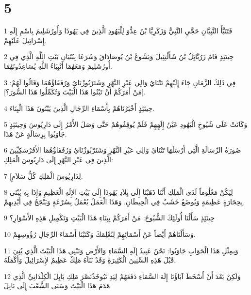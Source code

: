 \chapter{5}

\par 1 فَتَنَبَّأَ النَّبِيَّانِ حَجَّيِ النَّبِيُّ وَزَكَرِيَّا بْنُ عِدُّوَ لِلْيَهُودِ الَّذِينَ فِي يَهُوذَا وَأُورُشَلِيمَ بِاسْمِ إِلَهِ إِسْرَائِيلَ عَلَيْهِمْ.
\par 2 حِينَئِذٍ قَامَ زَرُبَّابَِلُ بْنُ شَأَلْتِئِيلَ وَيَشُوعُ بْنُ يُوصَادَاقَ وَشَرَعَا بِبُنْيَانِ بَيْتِ اللَّهِ الَّذِي فِي أُورُشَلِيمَ وَمَعَهُمَا أَنْبِيَاءُ اللَّهِ يُسَاعِدُونَهُمَا.
\par 3 فِي ذَلِكَ الزَّمَانِ جَاءَ إِلَيْهِمْ تَتْنَايُ وَالِي عَبْرِ النَّهْرِ وَشَتَرْبُوزْنَايُ وَرُفَقَاؤُهُمَا وَقَالُوا لَهُمْ: [مَنْ أَمَرَكُمْ أَنْ تَبْنُوا هَذَا الْبَيْتَ وَتُكَمِّلُوا هَذَا السُّورَ؟].
\par 4 حِينَئِذٍ أَخْبَرْنَاهُمْ بِأَسْمَاءِ الرِّجَالِ الَّذِينَ يَبْنُونَ هَذَا الْبِنَاءَ.
\par 5 وَكَانَتْ عَلَى شُيُوخِ الْيَهُودِ عَيْنُ إِلَهِهِمْ فَلَمْ يُوقِفُوهُمْ حَتَّى وَصَلَ الأَمْرُ إِلَى دَارِيُوسَ وَحِينَئِذٍ جَاوَبُوا بِرِسَالَةٍ عَنْ هَذَا.
\par 6 صُورَةُ الرِّسَالَةِ الَّتِي أَرْسَلَهَا تَتْنَايُ وَالِي عَبْرِ النَّهْرِ وَشَتَرْبُوزْنَايُ وَرُفَقَاؤُهُمَا الأَفَرْسَكِيِّينَ الَّذِينَ فِي عَبْرِ النَّهْرِ إِلَى دَارِيُوسَ الْمَلِكِ:
\par 7 [لِدَارِيُوسَ الْمَلِكِ كُلُّ سَلاَمٍ.
\par 8 لِيَكُنْ مَعْلُوماً لَدَى الْمَلِكِ أَنَّنَا ذَهَبْنَا إِلَى بِلاَدِ يَهُوذَا إِلَى بَيْتِ الإِلَهِ الْعَظِيمِ وَإِذَا بِهِ يُبْنَى بِحِجَارَةٍ عَظِيمَةٍ وَيُوضَعُ خَشَبٌ فِي الْحِيطَانِ. وَهَذَا الْعَمَلُ يُعْمَلُ بِسُرْعَةٍ وَيَنْجَحُ فِي أَيْدِيهِمْ.
\par 9 حِينَئِذٍ سَأَلْنَا أُولَئِكَ الشُّيُوخَ: مَنْ أَمَرَكُمْ بِبِنَاءِ هَذَا الْبَيْتِ وَتَكْمِيلِ هَذِهِ الأَسْوَارِ؟
\par 10 وَسَأَلْنَاهُمْ أَيْضاً عَنْ أَسْمَائِهِمْ لِنُعْلِمَكَ وَكَتَبْنَا أَسْمَاءَ الرِّجَالِ رُؤُوسِهِمْ.
\par 11 وَبِمِثْلِ هَذَا الْجَوَابِ جَاوَبُوا: نَحْنُ عَبِيدُ إِلَهِ السَّمَاءِ وَالأَرْضِ وَنَبْنِي هَذَا الْبَيْتَ الَّذِي بُنِيَ قَبْلَ هَذِهِ السِّنِينَ الْكَثِيرَةِ وَقَدْ بَنَاهُ مَلِكٌ عَظِيمٌ لإِسْرَائِيلَ وَأَكْمَلَهُ.
\par 12 وَلَكِنْ بَعْدَ أَنْ أَسْخَطَ آبَاؤُنَا إِلَهَ السَّمَاءِ دَفَعَهُمْ لِيَدِ نَبُوخَذْنَصَّرَ مَلِكِ بَابِلَ الْكِلْدَانِيِّ الَّذِي هَدَمَ هَذَا الْبَيْتَ وَسَبَى الشَّعْبَ إِلَى بَابِلَ.
